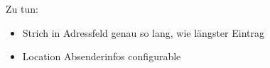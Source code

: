 \documentclass[twoside]{brbrief}
\begin{document}
	\maketitle{}
	
	\lipsum[1-2]
	
	Zu tun:
	\begin{itemize}
		\item Strich in Adressfeld genau so lang, wie längster Eintrag
		\item Location Absenderinfos configurable
	\end{itemize}
	
	
	
\end{document}
